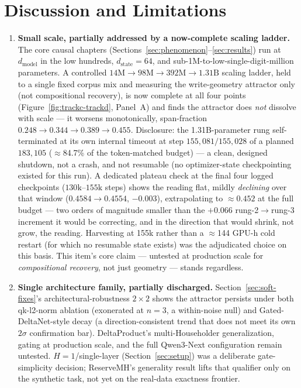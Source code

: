\section{Discussion and Limitations}
\label{sec:discussion}


\begin{enumerate}

\item \textbf{Small scale, partially addressed by a now-complete
scaling ladder.} The core causal chapters
(Sections~\ref{sec:phenomenon}--\ref{sec:results}) run at
$d_{\mathrm{model}}$ in the low hundreds, $d_{\mathrm{state}}{=}64$, and
sub-1M-to-low-single-digit-million parameters. A controlled
$14\mathrm{M}\to98\mathrm{M}\to392\mathrm{M}\to1.31\mathrm{B}$ scaling
ladder, held to a single fixed corpus mix and measuring the write-geometry
attractor only (not compositional recovery), is now complete at all four
points (Figure~\ref{fig:trackc-trackd}, Panel~A) and finds the attractor
does \emph{not} dissolve with scale --- it worsens monotonically,
span-fraction $0.248\to0.344\to0.389\to0.455$. Disclosure: the
1.31B-parameter rung self-terminated at its own internal timeout at step
$155{,}081/155{,}028$ of a planned $183{,}105$ ($\approx$84.7\% of the
token-matched budget) --- a clean, designed shutdown, not a crash, and not
resumable (no optimizer-state checkpointing existed for this run). A
dedicated plateau check at the final four logged checkpoints
($130\mathrm{k}$--$155\mathrm{k}$ steps) shows the reading flat, mildly
\emph{declining} over that window ($0.4584\to0.4554$, $-0.003$),
extrapolating to $\approx0.452$ at the full budget --- two orders of
magnitude smaller than the $+0.066$ rung-2$\to$rung-3 increment it would
be correcting, and in the direction that would shrink, not grow, the
reading. Harvesting at 155k rather than a $\approx$144 GPU-h cold restart
(for which no resumable state exists) was the adjudicated choice on this
basis. This item's core claim --- untested at production scale for
\emph{compositional recovery}, not just geometry --- stands regardless.

\item \textbf{Single architecture family, partially discharged.}
Section~\ref{sec:soft-fixes}'s architectural-robustness $2\times2$ shows
the attractor persists under both qk-l2-norm ablation (exonerated at
$n{=}3$, a within-noise null) and Gated-DeltaNet-style decay (a
direction-consistent trend that does not meet its own $2\sigma$
confirmation bar). DeltaProduct's multi-Householder generalization,
gating at production scale, and the full Qwen3-Next configuration remain
untested. $H{=}1$/single-layer (Section~\ref{sec:setup}) was a
deliberate gate-simplicity decision; ReserveMH's generality result lifts
that qualifier only on the synthetic task, not yet on the real-data
exactness frontier.


\end{enumerate}
